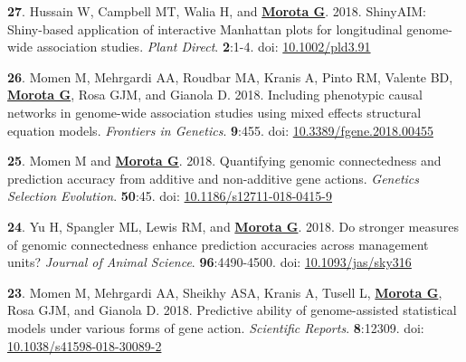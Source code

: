 \documentclass[margin,line,10pt]{res}
\newenvironment{list1}{
  \begin{list}{\ding{113}}{%
      \setlength{\itemsep}{0in}
      \setlength{\parsep}{0in} \setlength{\parskip}{0in}
      \setlength{\topsep}{0in} \setlength{\partopsep}{0in} 
      \setlength{\leftmargin}{0.17in}}}{\end{list}}
\begin{document}
\begin{resume}
\begin{list1}
\item  [{\bf 27}.] Hussain W, Campbell MT, Walia H, and \textbf{\underline{Morota G}}. 2018. ShinyAIM: Shiny-based application of interactive Manhattan plots for longitudinal genome-wide association studies. \emph{Plant Direct}. \textbf{2}:1-4. doi: \textcolor{blue}{\href{https://doi.org/10.1002/pld3.91}{10.1002/pld3.91}}

   \vspace{0.5cm}
  
\item  [{\bf 26}.] Momen M, Mehrgardi AA, Roudbar MA, Kranis A, Pinto RM, Valente BD, \textbf{\underline{Morota G}}, Rosa GJM, and Gianola D. 2018. Including phenotypic causal networks in genome-wide association studies using mixed effects structural equation models. \emph{Frontiers in Genetics}. \textbf{9}:455. doi: \textcolor{blue}{\href{https://doi.org/10.3389/fgene.2018.00455}{10.3389/fgene.2018.00455}}

  \vspace{0.5cm}
  
\item  [{\bf 25}.] Momen M and  \textbf{\underline{Morota G}}. 2018. Quantifying genomic connectedness and prediction accuracy from additive and non-additive gene actions. \emph{Genetics Selection Evolution}. \textbf{50}:45. doi: \textcolor{blue}{\href{https://doi.org/10.1186/s12711-018-0415-9}{10.1186/s12711-018-0415-9}}

  \vspace{0.5cm}
  
\item  [{\bf 24}.] Yu H, Spangler ML, Lewis RM, and {\bf \underline{Morota G}}. 2018.  Do stronger measures of genomic connectedness enhance prediction accuracies across management units? \emph{Journal of Animal Science}. \textbf{96}:4490-4500.  doi: \textcolor{blue}{\href{https://doi.org/10.1093/jas/sky316}{10.1093/jas/sky316}} 

  \vspace{0.5cm}

\item  [{\bf 23}.] Momen M, Mehrgardi AA, Sheikhy ASA, Kranis A, Tusell L, \textbf{\underline{Morota G}}, Rosa GJM, and Gianola D. 2018. Predictive ability of genome-assisted statistical models under various forms of gene action. \emph{Scientific Reports}. \textbf{8}:12309. doi: \textcolor{blue}{\href{https://doi.org/10.1038/s41598-018-30089-2}{10.1038/s41598-018-30089-2}} 

  \vspace{0.5cm}


\end{list1}
\end{resume}
\end{document}
